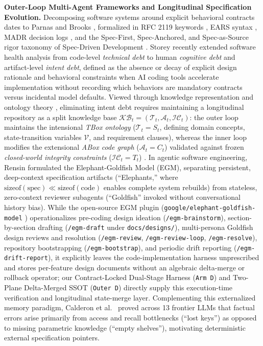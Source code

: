 \documentclass[11pt,a4paper,copyright]{google}
\begin{document}
\textbf{Outer-Loop Multi-Agent Frameworks and Longitudinal Specification Evolution.} Decomposing software systems around explicit behavioral contracts dates to Parnas \cite{parnas1972criteria} and Brooks \cite{brooks1987nosilver}, formalized in RFC 2119 keywords \cite{bradner1997rfc2119}, EARS syntax \cite{mavin2009ears}, MADR decision logs \cite{kopp2018madr}, and the Spec-First, Spec-Anchored, and Spec-as-Source rigor taxonomy of Spec-Driven Development \cite{piskala2026sdd}. Storey \cite{storey2026intent} recently extended software health analysis from code-level \emph{technical debt} to human \emph{cognitive debt} and artifact-level \emph{intent debt}, defined as the absence or decay of explicit design rationale and behavioral constraints when AI coding tools accelerate implementation without recording which behaviors are mandatory contracts versus incidental model defaults. Viewed through knowledge representation and ontology theory \cite{alchourron1985logic,katsuno1991update,hansson1994kernel,motik2009bridging}, eliminating intent debt requires maintaining a longitudinal repository as a split knowledge base $\mathcal{KB}_t = (\mathcal{T}_t, \mathcal{A}_t, \mathcal{IC}_t)$: the outer loop maintains the intensional \emph{TBox ontology} ($\mathcal{T}_t = S_t$, defining domain concepts, state-transition variables $\mathcal{V}$, and requirement clauses), whereas the inner loop modifies the extensional \emph{ABox code graph} ($\mathcal{A}_t = C_t$) validated against frozen \emph{closed-world integrity constraints} ($\mathcal{IC}_t = T_t$) \cite{motik2009bridging}. In agentic software engineering, Rensin \cite{rensin2026elephant} formulated the Elephant-Goldfish Model (EGM), separating persistent, deep-context specification artifacts (``Elephants,'' where $\mathrm{sizeof}(\text{spec}) \ll \mathrm{sizeof}(\text{code})$ enables complete system rebuilds) from stateless, zero-context reviewer subagents (``Goldfish'' invoked without conversational history bias). While the open-source EGM plugin (\texttt{google/elephant-goldfish-model} \cite{rensin2026elephant}) operationalizes pre-coding design ideation (\texttt{/egm-brainstorm}), section-by-section drafting (\texttt{/egm-draft} under \texttt{docs/designs/}), multi-persona Goldfish design reviews and resolution (\texttt{/egm-review}, \texttt{/egm-review-loop}, \texttt{/egm-resolve}), repository bootstrapping (\texttt{/egm-bootstrap}), and periodic drift reporting (\texttt{/egm-drift-report}), it explicitly leaves the code-implementation harness unprescribed and stores per-feature design documents without an algebraic delta-merge or rollback operator; our Contract-Locked Dual-Stage Harness (\texttt{Arm D}) and Two-Plane Delta-Merged SSOT (\texttt{Outer D}) directly supply this execution-time verification and longitudinal state-merge layer. Complementing this externalized memory paradigm, Calderon et al.\ \cite{calderon2026empty} proved across 13 frontier LLMs that factual errors arise primarily from access and recall bottlenecks (``lost keys'') as opposed to missing parametric knowledge (``empty shelves''), motivating deterministic external specification pointers.
\end{document}
